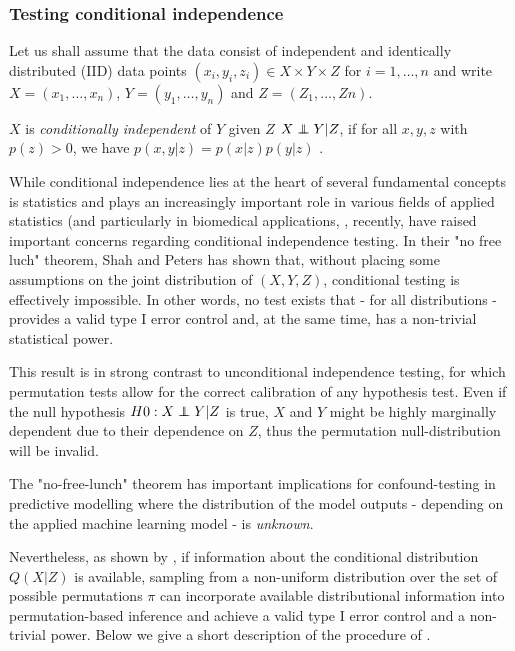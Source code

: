 \documentclass{article}
\begin{document}
\subsubsection*{Testing conditional independence}

Let us shall assume that the data consist of independent and identically distributed (IID) data points $(x_i, y_i, z_i) \in X \times Y \times Z$ for $i=1, \dots , n$ and write $X=(x_1, \dots ,x_n)$, $Y=(y_1, \dots, y_n)$ and $Z=(Z_1, \dots, Zn)$. 

$X$ is \emph{conditionally independent} of $Y$ given $Z$ $X \independent Y | Z$, if for all $x, y, z$ with $p(z) > 0$, we have $p(x, y|z) = p(x|z)p(y|z)$ \citep{dawid1979conditional}.

While conditional independence lies at the heart of several fundamental concepts is statistics and  plays an increasingly important role in various fields of applied statistics (and particularly in biomedical applications, \citep{spirtes2000causation, peters2016causal, fiedler2011mediation, candes2016panning}, recently, \cite{shah2020hardness} have raised important concerns regarding conditional independence testing.
In their "no free luch" theorem, Shah and Peters has shown that, without placing some assumptions on the joint distribution of $(X, Y, Z)$, conditional testing is effectively impossible. In other words, no test exists that - for all distributions - provides a valid type I error control and, at the same time, has a non-trivial statistical power.

This result is in strong contrast to unconditional independence testing, for which permutation tests  \citep{pitman1937significance, fisher1942189} allow for the correct calibration of any hypothesis test. Even if the null hypothesis $H0 :X \independent Y|Z$ is true, $X$ and $Y$ might be highly marginally dependent due to their dependence on $Z$,  thus the permutation null-distribution will be invalid.

The "no-free-lunch" theorem has important implications for confound-testing in predictive modelling where the distribution of the model outputs - depending on the applied machine learning model - is \emph{unknown}.

Nevertheless, as shown by \cite{berrett2020conditional}, if information about the conditional distribution $Q(X|Z)$ is available, sampling from a non-uniform distribution over the set of possible permutations $\pi$ can incorporate available distributional information into permutation-based inference and achieve a valid type I error control and a non-trivial power.
Below we give a short description of the procedure of \cite{berrett2020conditional}.
\end{document}
